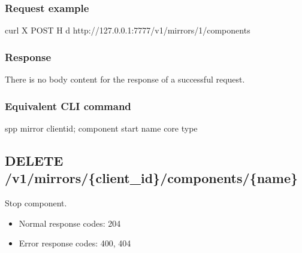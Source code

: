 \documentclass[a4paper,11pt,openany,oneside,english]{sphinxmanual}
\begin{document}
\subsubsection{Request example}
\label{\detokenize{api_ref/spp_mirror:id2}}
\begin{sphinxVerbatim}[commandchars=\\\{\},formatcom=\footnotesize]
 curl \PYGZhy{}X POST \PYGZhy{}H  
  \PYGZhy{}d  
  http://127.0.0.1:7777/v1/mirrors/1/components
\end{sphinxVerbatim}


\subsubsection{Response}
\label{\detokenize{api_ref/spp_mirror:id3}}
There is no body content for the response of a successful  request.


\subsubsection{Equivalent CLI command}
\label{\detokenize{api_ref/spp_mirror:id4}}
\begin{sphinxVerbatim}[commandchars=\\\{\},formatcom=\footnotesize]
spp \PYGZgt{} mirror \PYGZob{}client\PYGZus{}id\PYGZcb{}; component start \PYGZob{}name\PYGZcb{} \PYGZob{}core\PYGZcb{} \PYGZob{}type\PYGZcb{}
\end{sphinxVerbatim}


\subsection{DELETE /v1/mirrors/\{client\_id\}/components/\{name\}}
\label{\detokenize{api_ref/spp_mirror:delete-v1-mirrors-client-id-components-name}}
Stop component.
\begin{itemize}
\item {} 
Normal response codes: 204

\item {} 
Error response codes: 400, 404

\end{itemize}
\end{document}
